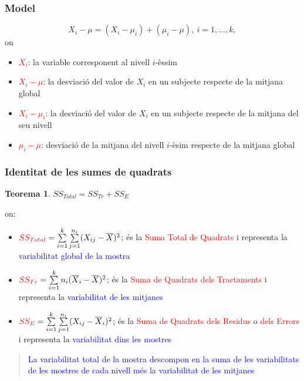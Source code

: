\documentclass[12pt,t]{beamer}
\newcommand{\red}[1]{\textcolor{red}{#1}}
\newcommand{\blue}[1]{\textcolor{blue}{#1}}
\theoremstyle{plain}
\newtheorem{teorema}{Teorema}
\theoremstyle{definition}
\begin{document}
\begin{frame}
\frametitle{Model}
$$
X_{i} -\mu=(X_{i} -\mu_i)+(\mu_i - \mu),\ i=1,\ldots,k,
$$
on
\begin{itemize}
\item \red{$X_{i}$}: la variable corresponent al nivell $i$-èssim
\medskip

\item \red{$X_{i}-\mu$}: la desviació del valor de $X_{i}$ en un subjecte respecte de la mitjana global
\medskip

\item \red{$X_{i}-\mu_i$}: la desviació del valor de $X_{i}$ en un subjecte respecte de la mitjana del seu nivell
\medskip

\item \red{$\mu_i -\mu$}: desviació de la mitjana del nivell $i$-èsim respecte de la mitjana global 
\end{itemize}
\end{frame}


\begin{frame}
\frametitle{Identitat de les sumes de quadrats}\vspace*{-2ex}

\begin{teorema}
$SS_{Total}=SS_{Tr}+SS_E$
\end{teorema}

on:\vspace*{-2ex}

\begin{itemize}
\item $\red{SS_{Total}}=\sum\limits_{i=1}^k\sum\limits_{j=1}^{n_i} (X_{ij}-\overline{X})^2$; és la \red{Suma Total de Quadrats} i representa la \blue{variabilitat global de la mostra}

\item $\red{SS_{Tr}}=\sum\limits_{i=1}^k n_i
(\overline{X}_{i}-\overline{X})^2$; és la \red{Suma de Quadrats dels Tractaments} i representa la \blue{variabilitat de les mitjanes} 

\item $\red{SS_E}=\sum\limits_{i=1}^k\sum\limits_{j=1}^{n_i} (X_{ij}-\overline{X}_{i})^2$; és la \red{Suma de Quadrats dels Residus} o \red{dels Errors} i representa la \blue{variabilitat dins les mostres}
\end{itemize}\pause

\begin{quote}
\blue{La variabilitat total de la mostra descompon en la suma de les variabilitats de les mostres de cada nivell més la variabilitat de les mitjanes}
\end{quote}

\end{frame}
\end{document}
